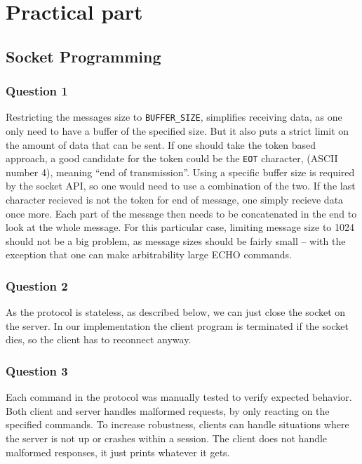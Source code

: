 
\section{Practical part}
\subsection{Socket Programming}

\subsubsection{Question 1}

Restricting the messages size to \texttt{BUFFER\_SIZE}, simplifies receiving data, as one only need to have a buffer of the specified size. But it also puts a strict limit on the amount of data that can be sent.
If one should take the token based approach, a good candidate for the token could be the \texttt{EOT} character, (ASCII number 4), meaning ``end of transmission''.
Using a specific buffer size is required by the socket API, so one would need to use a combination of the two. If the last character recieved is not the token for end of message, one simply recieve data once more. Each part of the message then needs to be concatenated in the end to look at the whole message.
For this particular case, limiting message size to 1024 should not be a big problem, as message sizes should be fairly small -- with the exception that one can make arbitrability large ECHO commands.

\subsubsection{Question 2}

As the protocol is stateless, as described below, we can just close the socket on the server. In our implementation the client program is terminated if the socket dies, so the client has to reconnect anyway.

\subsubsection{Question 3}

Each command in the protocol was manually tested to verify expected behavior. Both client and server handles malformed requests,
by only reacting on the specified commands. To increase robustness, clients can handle situations where the server is not up
or crashes within a session. The client does not handle malformed responses, it just prints whatever it gets.

